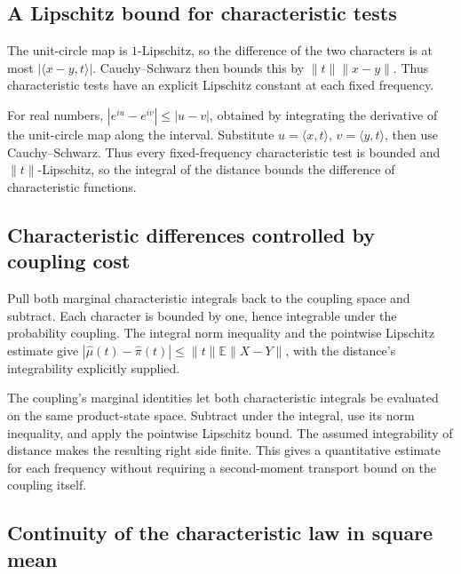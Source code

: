 \documentclass[11pt,a4paper]{report}
\begin{document}
\subsection{\texorpdfstring{A Lipschitz bound for characteristic tests}{A Lipschitz bound for characteristic tests}}
\label{report-step-UnadjustedLangevin-CouplingLimit-lean-1}


The unit-circle map is \(1\)-Lipschitz, so the difference of the two characters is at most \(|\langle x-y,t\rangle|\). Cauchy–Schwarz then bounds this by \(\|t\|\|x-y\|\). Thus characteristic tests have an explicit Lipschitz constant at each fixed frequency.



For real numbers, \(|e^{iu}-e^{iv}|\le|u-v|\), obtained by integrating the derivative of the unit-circle map along the interval. Substitute \(u=\langle x,t\rangle\), \(v=\langle y,t\rangle\), then use Cauchy–Schwarz. Thus every fixed-frequency characteristic test is bounded and \(\|t\|\)-Lipschitz, so the integral of the distance bounds the difference of characteristic functions.

\subsection{\texorpdfstring{Characteristic differences controlled by coupling cost}{Characteristic differences controlled by coupling cost}}
\label{report-step-UnadjustedLangevin-CouplingLimit-lean-2}


Pull both marginal characteristic integrals back to the coupling space and subtract. Each character is bounded by one, hence integrable under the probability coupling. The integral norm inequality and the pointwise Lipschitz estimate give \(|\widehat\mu(t)-\widehat\pi(t)|\le\|t\|\mathbb E\|X-Y\|\), with the distance's integrability explicitly supplied.



The coupling's marginal identities let both characteristic integrals be evaluated on the same product-state space. Subtract under the integral, use its norm inequality, and apply the pointwise Lipschitz bound. The assumed integrability of distance makes the resulting right side finite. This gives a quantitative estimate for each frequency without requiring a second-moment transport bound on the coupling itself.

\subsection{\texorpdfstring{Continuity of the characteristic law in square mean}{Continuity of the characteristic law in square mean}}
\label{report-step-UnadjustedLangevin-CouplingLimit-lean-3}
\end{document}
